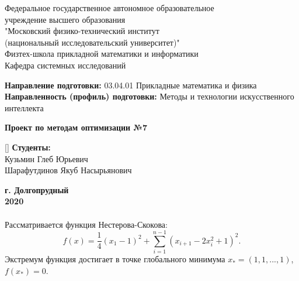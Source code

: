 \documentclass[12pt]{report}
\newenvironment{myparacol}[2][]{%
	\begin{paracol}{#2}[#1]\setlength{\parindent}{0pt}}{%
	\end{paracol}}
\begin{document}

\begin{titlepage}
	\begin{center}
		Федеральное государственное автономное образовательное\\ учреждение
		высшего образования\\
		"Московский физико-технический институт\\ (национальный исследовательский университет)"\\
		Физтех-школа прикладной математики и информатики\\
		Кафедра системных исследований\\
	\end{center}
	\textbf{Направление подготовки:} 03.04.01 Прикладные математика и физика\\
	\textbf{Направленность (профиль) подготовки:} Методы и технологии искусственного интеллекта
	\begin{center}
		\vspace{4cm}
		\textbf{Проект по методам оптимизации №7}\\
		\vspace{4cm}
	\end{center}
	\begin{myparacol}{2}
		\switchcolumn
		\textbf{Студенты:}\\
		Кузьмин Глеб Юрьевич\\
		Шарафутдинов Якуб Насырьянович\\
	\end{myparacol}
	\begin{center}
		\vspace{6cm}
		\textbf{г. Долгопрудный\\
			2020}
	\end{center}
\end{titlepage}

\paragraph{}Рассматривается функция Нестерова-Скокова:
\begin{equation}\label{Nesterov-Skokov}
f(x)=\frac{1}{4}(x_{1}-1)^{2}+\sum_{i=1}^{n-1}(x_{i+1}-2x_{i}^{2}+1)^{2}.
\end{equation} 
Экстремум функция достигает в точке глобального минимума $x_{*}=(1,1,...,1)$, $f(x_{*})=0$.
\end{document}
